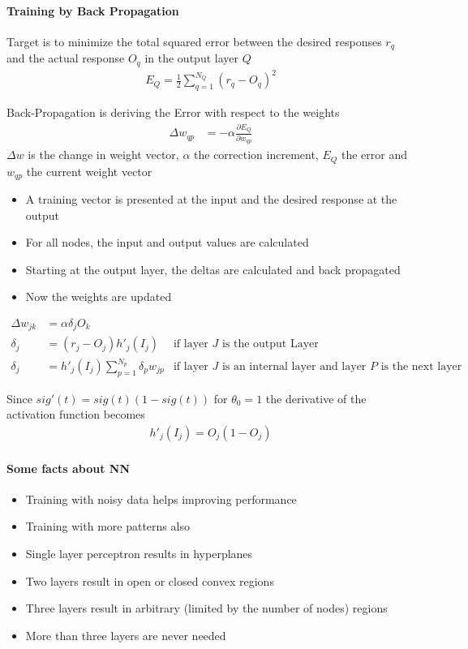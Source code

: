 \paragraph{Training by Back Propagation}
Target is to minimize the total squared error between the desired responses
$r_q$ and the actual response $O_q$ in the output layer $Q$
\begin{align*}
	E_Q = \frac{1}{2} \sum_{q=1}^{N_Q}(r_q-O_q)^2
\end{align*}

Back-Propagation is deriving the Error with respect to the weights
\begin{align*}
	\Delta w_{qp} &= -\alpha \frac{\partial E_Q}{\partial w_{qp}}
\end{align*}
$\Delta w$ is the change in weight vector, $\alpha$ the correction increment,
$E_Q$ the error and $w_{qp}$ the current weight vector

\begin{itemize}
\item A training vector is presented at
the input and the desired response
at the output
\item For all nodes, the input and output values are calculated
\item Starting at the output layer, the
deltas are calculated and back
propagated
\item Now the weights are updated
\end{itemize}


\begin{align*}
\Delta w_{jk} &= \alpha \delta_j O_k& \\
\delta_j &= (r_j-O_j) h'_j(I_j) & \text{if layer $J$ is the output Layer} \\
\delta_j &= h'_j(I_j) \sum_{p=1}^{N_p}\delta_p w_{jp} & \text{if layer $J$ is an internal layer and layer $P$ is the next layer}
\end{align*}

Since $sig'(t) = sig(t)(1-sig(t))$ for $\theta_0=1$ the derivative of the activation function becomes
\begin{align*}
h'_j(I_j) = O_j(1-O_j)
\end{align*}

\paragraph{Some facts about NN}
\begin{itemize}
\item Training with noisy data helps improving performance
\item Training with more patterns also
\item Single layer perceptron results in hyperplanes
\item Two layers result in open or closed convex regions
\item Three layers result in arbitrary (limited by the number of nodes) regions
\item More than three layers are never needed
\end{itemize}

